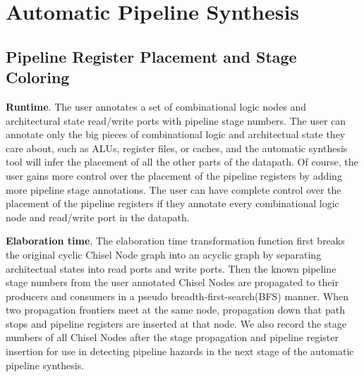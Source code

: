 \section{Automatic Pipeline Synthesis}

\subsection{Pipeline Register Placement and Stage Coloring}
{\bf Runtime}. The user annotates a set of combinational logic nodes and architectural state read/write ports with pipeline stage numbers. The user can annotate only the big pieces of combinational logic and architectual state they care about, such as ALUs, register files, or caches, and the automatic synthesis tool will infer the placement of all the other parts of the datapath. Of course, the user gains more control over the placement of the pipeline registers by adding more pipeline stage annotations. The user can have complete control over the placement of the pipeline registers if they annotate every combinational logic node and read/write port in the datapath.

{\bf Elaboration time}. The elaboration time transformation function first breaks the original cyclic Chisel Node graph into an acyclic graph by separating architectual states into read ports and write ports. Then the known pipeline stage numbers from the user annotated Chisel Nodes are propagated to their producers and consumers in a pseudo breadth-first-search(BFS) manner. When two propagation frontiers meet at the same node, propagation down that path stops and pipeline registers are inserted at that node. We also record the stage numbers of all Chisel Nodes after the stage propagation and pipeline register insertion for use in detecting pipeline hazards in the next stage of the automatic pipeline synthesis.

